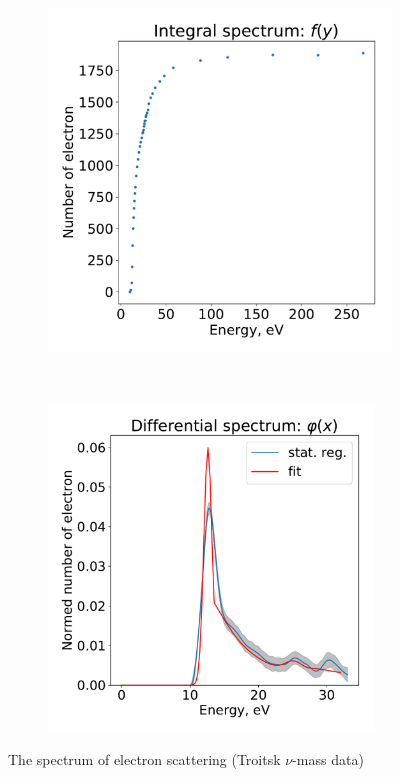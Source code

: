 \documentclass{webofc}
\begin{document}
\begin{figure}[ht!]
	\begin{subfigure}[b]{0.5\textwidth}
    	\includegraphics[width=0.95\linewidth]{image/fig01}
        \caption{}
        \label{pic-01-a}
    \end{subfigure}
	~
    \begin{subfigure}[b]{0.5\textwidth}
		\includegraphics[width=0.95\textwidth]{image/fig02}
        \caption{}
        \label{pic-01-b}
    \end{subfigure}
    \caption{The spectrum of electron scattering (Troitsk $\nu$-mass data)}
\end{figure}
\end{document}
